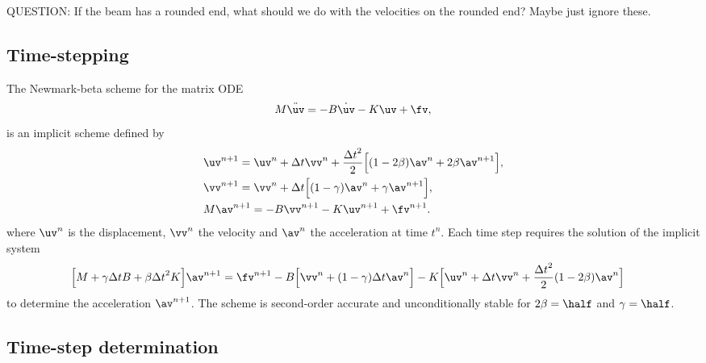 \documentclass[11pt]{article}
\newcommand{\dt}{{\Delta t}}
\begin{document}
QUESTION: If the beam has a rounded end, what should we do with the velocities on the rounded end? Maybe just ignore
these. 


\subsection{Time-stepping}
The Newmark-beta scheme for the matrix ODE 
\begin{align*}
   M \ddot\uv = -B \dot\uv - K \uv + \fv ,
\end{align*}
is an implicit scheme defined by
\begin{align*}
 &  \uv^{n+1} = \uv^n + \dt\vv^n + \frac{\dt^2}{2}\Big[ (1-2\beta) \av^n + 2\beta \av^{n+1} \Big],  \\
 &  \vv^{n+1} = \vv^n + \dt\Big[  (1-\gamma) \av^n + \gamma \av^{n+1} \Big]    , \\
 &  M \av^{n+1} = -B \vv^{n+1} -K \uv^{n+1} + \fv^{n+1} .
\end{align*}
where $\uv^n$ is the displacement, $\vv^n$ the velocity and $\av^n$ the acceleration at time $t^n$. 
Each time step requires the solution of the implicit system
\begin{align}
 &  \Big[ M + \gamma\dt B + \beta\dt^2 K \Big] \av^{n+1} =
      \fv^{n+1} 
      - B \Big[ \vv^n + (1-\gamma) \dt \av^n \Big] 
      - K\Big[ \uv^n + \dt\vv^n + \frac{\dt^2}{2} (1-2\beta) \av^n \Big] 
   \label{eq:NewmarkMatrix}
\end{align}
to determine the acceleration $\av^{n+1}$. 
The scheme is second-order accurate and unconditionally stable for $2\beta=\half$ and $\gamma=\half$. 

\newcommand{\uHat}{\hat{u}}
\newcommand{\vHat}{\hat{v}}
\newcommand{\Ahat}{\hat{A}}
\newcommand{\Bhat}{\hat{B}}
\newcommand{\lambdaHat}{\hat{\lambda}}
\subsection{Time-step determination}
\end{document}
